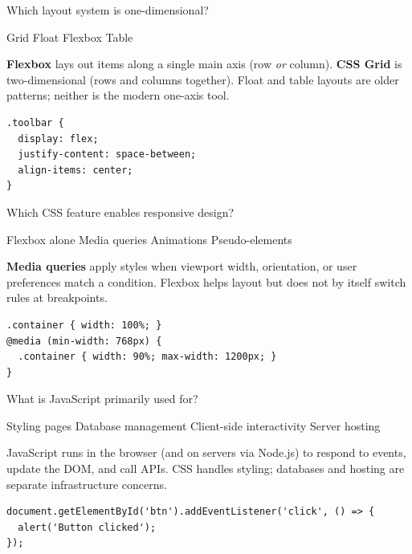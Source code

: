\newpage



\question[4]
Which layout system is one-dimensional?
\begin{choices}
  \choice Grid
  \choice Float
  \CorrectChoice Flexbox
  \choice Table
\end{choices}
\begin{solution}
  \textbf{Flexbox} lays out items along a single main axis (row \emph{or} column). \textbf{CSS Grid} is two-dimensional (rows and columns together). Float and table layouts are older patterns; neither is the modern one-axis tool.
\begin{lstlisting}[style=css]
.toolbar {
  display: flex;
  justify-content: space-between;
  align-items: center;
}
\end{lstlisting}
\end{solution}

\question[4]
Which CSS feature enables responsive design?
\begin{choices}
  \choice Flexbox alone
  \CorrectChoice Media queries
  \choice Animations
  \choice Pseudo-elements
\end{choices}
\begin{solution}
  \textbf{Media queries} apply styles when viewport width, orientation, or user preferences match a condition. Flexbox helps layout but does not by itself switch rules at breakpoints.
\begin{lstlisting}[style=css]
.container { width: 100%; }
@media (min-width: 768px) {
  .container { width: 90%; max-width: 1200px; }
}
\end{lstlisting}
\end{solution}

\newpage


\question[4]
What is JavaScript primarily used for?
\begin{choices}
  \choice Styling pages
  \choice Database management
  \CorrectChoice Client-side interactivity
  \choice Server hosting
\end{choices}
\begin{solution}
  JavaScript runs in the browser (and on servers via Node.js) to respond to events, update the DOM, and call APIs. CSS handles styling; databases and hosting are separate infrastructure concerns.
\begin{lstlisting}[style=js]
document.getElementById('btn').addEventListener('click', () => {
  alert('Button clicked');
});
\end{lstlisting}
\end{solution}

